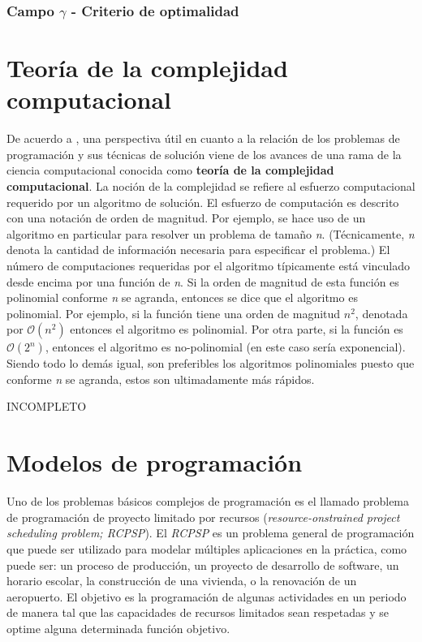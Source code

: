 \documentclass[spanish,draft,12pt,headsepline,footsepline,paper=letter]{scrreprt}
\newcommand{\BigO}{\ensuremath{\mathcal{O}}}%
\begin{document}
\subsubsection{Campo $\gamma$ - Criterio de optimalidad}



\section{Teoría de la complejidad computacional} %
\label{teoria_complejidad_computacional}

De acuerdo a \cite[p.~6]{Baker2009}, una perspectiva útil en cuanto a la relación de los problemas de programación y sus técnicas de solución viene de los avances de una rama de la ciencia computacional conocida como \textbf{teoría de la complejidad computacional}. La noción de la complejidad se refiere al esfuerzo computacional requerido por un algoritmo de solución. El esfuerzo de computación es descrito con una notación de orden de magnitud.
%
Por ejemplo, se hace uso de un algoritmo en particular para resolver un problema de tamaño \textit{n}. (Técnicamente, \textit{n} denota la cantidad de información necesaria para especificar el problema.) El número de computaciones requeridas por el algoritmo típicamente está vinculado desde encima por una función de \textit{n}. Si la orden de magnitud de esta función es polinomial conforme \textit{n} se agranda, entonces se dice que el algoritmo es polinomial.
%
Por ejemplo, si la función tiene una orden de magnitud $\textit{n}^2$, denotada por $\BigO(\textit{n}^2)$ entonces el algoritmo es polinomial. Por otra parte, si la función es $\BigO(2^\textit{n})$, entonces el algoritmo es no-polinomial (en este caso sería exponencial). Siendo todo lo demás igual, son preferibles los algoritmos polinomiales puesto que conforme \textit{n} se agranda, estos son ultimadamente más rápidos.

INCOMPLETO

\section{Modelos de programación}

Uno de los problemas básicos complejos de programación es el llamado problema de programación de proyecto limitado por recursos (\textit{resource-onstrained project scheduling problem; RCPSP}). El \textit{RCPSP} es un problema general de programación que puede ser utilizado para modelar múltiples aplicaciones en la práctica, como puede ser: un proceso de producción, un proyecto de desarrollo de software, un horario escolar, la construcción de una vivienda, o la renovación de un aeropuerto. El objetivo es la programación de algunas actividades en un periodo de manera tal que las capacidades de recursos limitados sean respetadas y se optime alguna determinada función objetivo.
\end{document}
